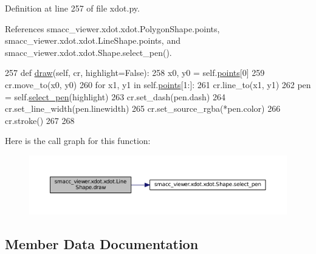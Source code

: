 Definition at line 257 of file xdot.\+py.



References smacc\+\_\+viewer.\+xdot.\+xdot.\+Polygon\+Shape.\+points, smacc\+\_\+viewer.\+xdot.\+xdot.\+Line\+Shape.\+points, and smacc\+\_\+viewer.\+xdot.\+xdot.\+Shape.\+select\+\_\+pen().


\begin{DoxyCode}
257     \textcolor{keyword}{def }\hyperlink{classsmacc__viewer_1_1xdot_1_1xdot_1_1LineShape_a25a1eb5c976ae0c8f5ac97b6ddb2afef}{draw}(self, cr, highlight=False):
258         x0, y0 = self.\hyperlink{classsmacc__viewer_1_1xdot_1_1xdot_1_1LineShape_a68e8fd028bbfa9bb1dfd04fa96400d39}{points}[0]
259         cr.move\_to(x0, y0)
260         \textcolor{keywordflow}{for} x1, y1 \textcolor{keywordflow}{in} self.\hyperlink{classsmacc__viewer_1_1xdot_1_1xdot_1_1LineShape_a68e8fd028bbfa9bb1dfd04fa96400d39}{points}[1:]:
261             cr.line\_to(x1, y1)
262         pen = self.\hyperlink{classsmacc__viewer_1_1xdot_1_1xdot_1_1Shape_a447a62283d0acd07b7bca2106d2de6e6}{select\_pen}(highlight)
263         cr.set\_dash(pen.dash)
264         cr.set\_line\_width(pen.linewidth)
265         cr.set\_source\_rgba(*pen.color)
266         cr.stroke()
267 
268 
\end{DoxyCode}


Here is the call graph for this function\+:
\nopagebreak
\begin{figure}[H]
\begin{center}
\leavevmode
\includegraphics[width=350pt]{classsmacc__viewer_1_1xdot_1_1xdot_1_1LineShape_a25a1eb5c976ae0c8f5ac97b6ddb2afef_cgraph}
\end{center}
\end{figure}




\subsection{Member Data Documentation}

